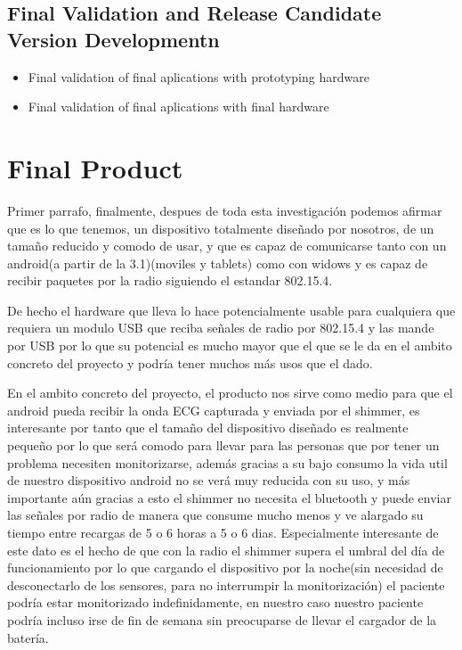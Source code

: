 		\subsection{Final Validation and Release Candidate Version Developmentn}
		\label{ssec:Final.Validation}	
		\begin{itemize}
		\item Final validation of final aplications with prototyping hardware
		\item Final validation of final aplications with final hardware
		\end{itemize}
		

		\section{Final Product}
		
		Primer parrafo, finalmente, despues de toda esta investigación podemos afirmar que es lo que tenemos, un dispositivo totalmente diseñado por nosotros, de un tamaño reducido y comodo de usar, y que es capaz de comunicarse tanto con un android(a partir de la 3.1)(moviles y tablets) como con widows y es capaz de recibir paquetes por la radio siguiendo el estandar 802.15.4. 

		De hecho el hardware que lleva lo hace potencialmente usable para cualquiera que requiera un modulo USB que reciba señales de radio por 802.15.4 y las mande por USB por lo que su potencial es mucho mayor que el que se le da en el ambito concreto del proyecto y podría tener muchos más usos que el dado.

		En el ambito concreto del proyecto, el producto nos sirve como medio para que el android pueda recibir la onda ECG capturada y enviada por el shimmer, es interesante por tanto que el tamaño del dispositivo diseñado es realmente pequeño por lo que será comodo para llevar para las personas que por tener un problema necesiten monitorizarse, además gracias a su bajo consumo la vida util de nuestro dispositivo android no se verá muy reducida con su uso, y más importante aún  gracias a esto el shimmer no necesita el bluetooth y puede enviar las señales por radio de manera que consume mucho menos y ve alargado su tiempo entre recargas de 5 o 6 horas a 5 o 6 dias. Especialmente interesante de este dato es el hecho de que con la radio el shimmer supera el umbral del día de funcionamiento por lo que cargando el dispositivo por la noche(sin necesidad de desconectarlo de los sensores, para no interrumpir la monitorización) el paciente podría estar monitorizado indefinidamente, en nuestro caso nuestro paciente podría incluso irse de fin de semana sin preocuparse de llevar el cargador de la batería.

